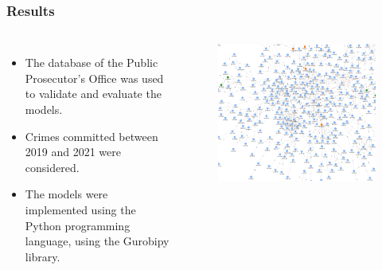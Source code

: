 \documentclass[aspectratio=169]{beamer}
\begin{document}
\begin{frame}
\frametitle{Results}
\begin{columns}
    \begin{itemize}
      \item The database of the Public Prosecutor's Office was used to validate and evaluate the models.
      \item Crimes committed between 2019 and 2021 were considered.
      \item The models were implemented using the Python programming language, using the Gurobipy library.
    \end{itemize}
    \begin{figure}[ht]
      \centering
      \includegraphics[width=\textwidth]{images/network-ncam.png}
    \end{figure}
  \end{columns}
\end{frame}
\end{document}
